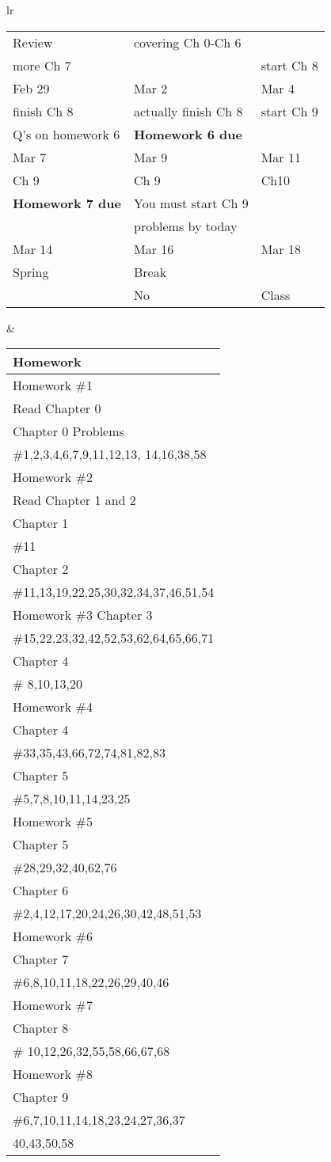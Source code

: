 \documentclass[11pt]{article}
\begin{document}
\begin{tabular}{lr}
\begin{tabular}{|l|l|l|}
Review &covering Ch 0-Ch 6&\\
more Ch 7&&start Ch 8\\
\hline
Feb 29 & Mar 2 & Mar 4 \\
finish Ch 8 & actually finish Ch 8 & start Ch 9\\
Q's on homework 6&\textbf{Homework  6 due}&\\
\hline
Mar 7 & Mar 9 & Mar 11\\
Ch 9 & Ch 9&Ch10\\
\textbf{Homework 7 due}&You must start Ch 9 &\\
& problems by today &\\
\hline
Mar 14&Mar 16 & Mar 18 \\
Spring& Break&\\
& \quad \quad \quad \quad No & Class\\
\hline
\end{tabular}
&
\begin{tabular}{|p{6cm}|}
\hline
Homework \\
\hline \hline
Homework \#1\\
Read Chapter 0\\
Chapter 0 Problems\\
\#1,2,3,4,6,7,9,11,12,13, 14,16,38,58\\
\hline
Homework \#2\\
Read Chapter 1 and 2\\
Chapter 1\\
\#11\\
Chapter 2\\
\#11,13,19,22,25,30,32,34,37,46,51,54\\
\hline
Homework \#3
Chapter 3\\
\#15,22,23,32,42,52,53,62,64,65,66,71\\
Chapter 4\\
\# 8,10,13,20 \\
\hline
Homework \#4\\
Chapter 4\\
\#33,35,43,66,72,74,81,82,83\\
Chapter 5\\
\#5,7,8,10,11,14,23,25\\
\hline
Homework \#5\\
Chapter 5\\
\#28,29,32,40,62,76\\
Chapter 6\\
\#2,4,12,17,20,24,26,30,42,48,51,53\\
\hline
Homework \#6\\
Chapter 7\\
\#6,8,10,11,18,22,26,29,40,46\\
\hline
Homework \#7\\
Chapter 8\\
\# 10,12,26,32,55,58,66,67,68\\
\hline
Homework \#8\\
Chapter 9\\
\#6,7,10,11,14,18,23,24,27,36,37\\
40,43,50,58\\
\hline
\end{tabular}
\end{tabular}
\end{document}
